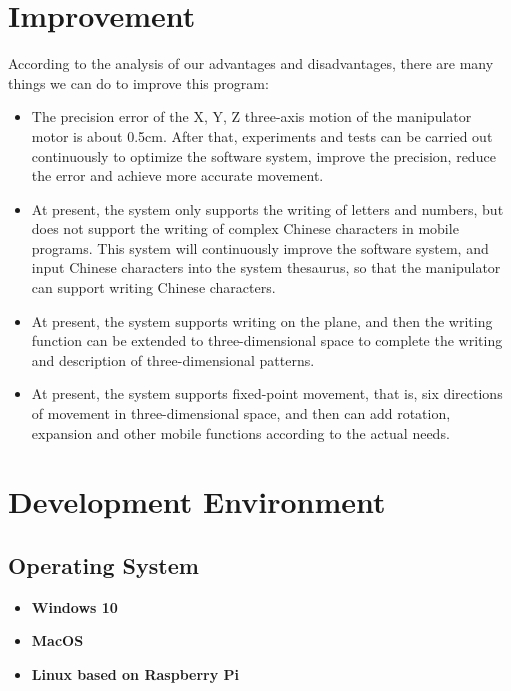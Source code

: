 \documentclass{hci}
\begin{document}
\section{Improvement}
According to the analysis of our advantages and disadvantages, there are many things we can do to improve this program:
\begin{itemize}
	\item The precision error of the X, Y, Z three-axis motion of the manipulator motor is about 0.5cm. After that, experiments and tests can be carried out continuously to optimize the software system, improve the precision, reduce the error and achieve more accurate movement.
	\item At present, the system only supports the writing of letters and numbers, but does not support the writing of complex Chinese characters in mobile programs. This system will continuously improve the software system, and input Chinese characters into the system thesaurus, so that the manipulator can support writing Chinese characters.
	\item At present, the system supports writing on the plane, and then the writing function can be extended to three-dimensional space to complete the writing and description of three-dimensional patterns.
	\item At present, the system supports fixed-point movement, that is, six directions of movement in three-dimensional space, and then can add rotation, expansion and other mobile functions according to the actual needs.
\end{itemize}

\section{Development Environment}
\subsection{Operating System}
\begin{itemize}
	\item \textbf{Windows 10}
	\item \textbf{MacOS}	
	\item \textbf{Linux based on Raspberry Pi}
\end{itemize}
\end{document}
